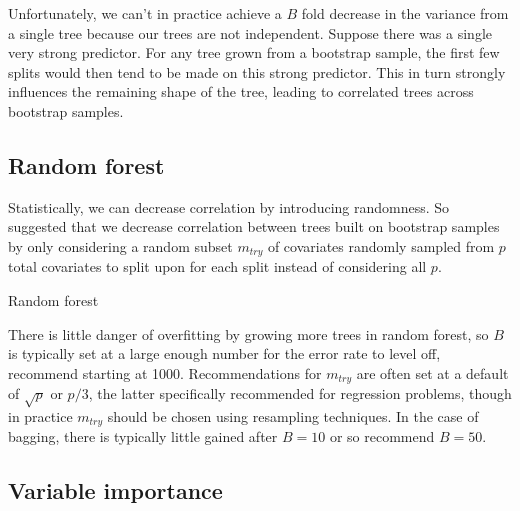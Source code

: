 \documentclass[12pt]{article}
\begin{document}
Unfortunately, we can't in practice achieve a $B$ fold decrease in the variance from a single tree because our trees are not independent. Suppose there was a single very strong predictor. For any tree grown from a bootstrap sample, the first few splits would then tend to be made on this strong predictor. This in turn strongly influences the remaining shape of the tree, leading to correlated trees across bootstrap samples. 


\subsection{Random forest} %
\label{sub:random_forest}

Statistically, we can decrease correlation by introducing randomness. So \textcite{rf} suggested that we decrease correlation between trees built on bootstrap samples by only considering a random subset $m_{try}$ of covariates randomly sampled from $p$ total covariates to split upon for each split instead of considering all $p$.

\begin{algorithm}[h]
 \caption{Random forest}
\end{algorithm}

There is little danger of overfitting by growing more trees in random forest, so $B$ is typically set at a large enough number for the error rate to level off, \textcite{apm} recommend starting at 1000. Recommendations for $m_{try}$ are often set at a default of $\sqrt{p}$ or $p/3$, the latter specifically recommended for regression problems, though in practice $m_{try}$ should be chosen using resampling techniques. In the case of bagging, there is typically little gained after $B = 10$ or so \textcite{apm} recommend $B = 50$.


\subsection{Variable importance} %
\label{sub:variable_importance_rf}
\end{document}
